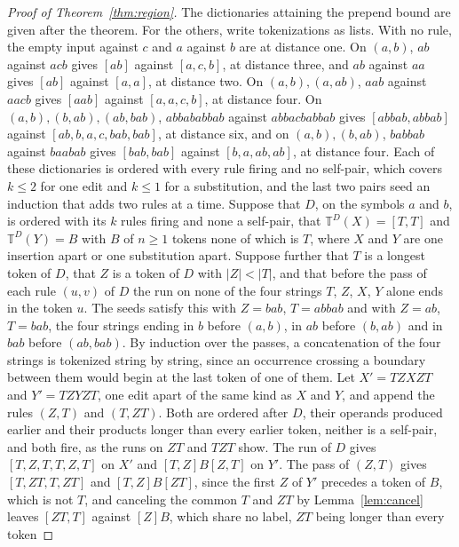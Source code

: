 \documentclass[11pt,a4paper]{article}
\theoremstyle{definition}
\theoremstyle{plain}
\newcommand{\T}{\mathbb{T}}
\begin{document}
\begin{proof}[Proof of Theorem~\ref{thm:region}]
The dictionaries attaining the prepend bound are given after the theorem. For the others, write tokenizations as lists.
With no rule, the empty input against \(c\) and \(a\) against \(b\) are at distance one. On \((a, b)\), \(ab\) against
\(acb\) gives \([ab]\) against \([a, c, b]\), at distance three, and \(ab\) against \(aa\) gives \([ab]\) against
\([a, a]\), at distance two. On \((a, b), (a, ab)\), \(aab\) against \(aacb\) gives \([aab]\) against \([a, a, c, b]\),
at distance four. On \((a, b), (b, ab), (ab, bab)\), \(abbababbab\) against \(abbacbabbab\) gives \([abbab, abbab]\)
against \([ab, b, a, c, bab, bab]\), at distance six, and on \((a, b), (b, ab)\), \(babbab\) against \(baabab\) gives
\([bab, bab]\) against \([b, a, ab, ab]\), at distance four. Each of these dictionaries is ordered with every rule
firing and no self-pair, which covers \(k \le 2\) for one edit and \(k \le 1\) for a substitution, and the last two
pairs seed an induction that adds two rules at a time. Suppose that \(D\), on the symbols \(a\) and \(b\), is ordered
with its \(k\) rules firing and none a self-pair, that \(\T^D(X) = [T, T]\) and \(\T^D(Y) = B\) with \(B\) of
\(n \ge 1\) tokens none of which is \(T\), where \(X\) and \(Y\) are one insertion apart or one substitution apart.
Suppose further that \(T\) is a longest token of \(D\), that \(Z\) is a token of \(D\) with \(|Z| < |T|\), and that
before the pass of each rule \((u, v)\) of \(D\) the run on none of the four strings \(T\), \(Z\), \(X\), \(Y\) alone
ends in the token \(u\). The seeds satisfy this with \(Z = bab\), \(T = abbab\) and with \(Z = ab\), \(T = bab\), the
four strings ending in \(b\) before \((a, b)\), in \(ab\) before \((b, ab)\) and in \(bab\) before \((ab, bab)\). By
induction over the passes, a concatenation of the four strings is tokenized string by string, since an occurrence
crossing a boundary between them would begin at the last token of one of them. Let \(X' = TZXZT\) and \(Y' = TZYZT\),
one edit apart of the same kind as \(X\) and \(Y\), and append the rules \((Z, T)\) and \((T, ZT)\). Both are ordered
after \(D\), their operands produced earlier and their products longer than every earlier token, neither is a self-pair,
and both fire, as the runs on \(ZT\) and \(TZT\) show. The run of \(D\) gives \([T, Z, T, T, Z, T]\) on \(X'\) and
\([T, Z] B [Z, T]\) on \(Y'\). The pass of \((Z, T)\) gives \([T, ZT, T, ZT]\) and \([T, Z] B [ZT]\), since the first
\(Z\) of \(Y'\) precedes a token of \(B\), which is not \(T\), and canceling the common \(T\) and \(ZT\) by
Lemma~\ref{lem:cancel} leaves \([ZT, T]\) against \([Z] B\), which share no label, \(ZT\) being longer than every token

\end{proof}
\end{document}
